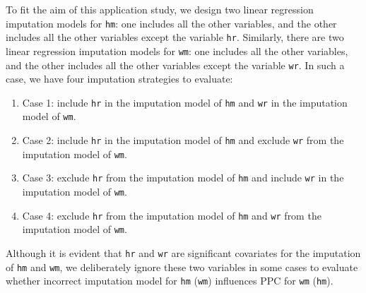 	To fit the aim of this application study, we design two linear regression imputation models for \texttt{hm}: one includes all the other variables, and the other includes all the other variables except the variable \texttt{hr}. Similarly, there are two linear regression imputation models for \texttt{wm}: one includes all the other variables, and the other includes all the other variables except the variable \texttt{wr}. In such a case, we have four imputation strategies to evaluate:
	\begin{enumerate}
		\item Case 1: include \texttt{hr} in the imputation model of \texttt{hm} and \texttt{wr} in the imputation model of \texttt{wm}.
		\item Case 2: include \texttt{hr} in the imputation model of \texttt{hm} and exclude \texttt{wr} from the imputation model of \texttt{wm}.
		\item Case 3: exclude \texttt{hr} from the imputation model of \texttt{hm} and include \texttt{wr} in the imputation model of \texttt{wm}.
		\item Case 4: exclude \texttt{hr} from the imputation model of \texttt{hm} and \texttt{wr} from the imputation model of \texttt{wm}.
	\end{enumerate}
	Although it is evident that \texttt{hr} and \texttt{wr} are significant covariates for the imputation of \texttt{hm} and \texttt{wm}, we deliberately ignore these two variables in some cases to evaluate whether incorrect imputation model for \texttt{hm} (\texttt{wm}) influences PPC for \texttt{wm} (\texttt{hm}).
	 
